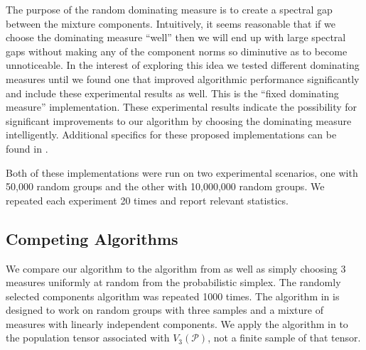 \documentclass[aos,preprint]{imsart}
\def\sP{\mathscr{P}}
\theoremstyle{plain}
\theoremstyle{defintion}
\begin{document}
	The purpose of the random dominating measure is to create a spectral gap between the mixture components. Intuitively, it seems reasonable that if we choose the dominating measure ``well'' then we will end up with large spectral gaps without making any of the component norms so diminutive as to become unnoticeable. In the interest of exploring this idea we tested different dominating measures until we found one that improved algorithmic performance significantly and include these experimental results as well. This is the ``fixed dominating measure'' implementation. These experimental results indicate the possibility for significant improvements to our algorithm by choosing the dominating measure intelligently. Additional specifics for these proposed implementations can be found in \cite{arxiv16}.

	Both of these implementations were run on two experimental scenarios, one with 50,000 random groups and the other with 10,000,000 random groups. We repeated each experiment 20 times and report relevant statistics.

\subsection{Competing Algorithms}
We compare our algorithm to the algorithm from \cite{anandkumar14} as well as simply choosing $3$ measures uniformly at random from the probabilistic simplex. The randomly selected components algorithm was repeated 1000 times. The algorithm in \cite{anandkumar14} is designed to work on random groups with three samples and a mixture of measures with linearly independent components. We apply the algorithm in \cite{anandkumar14} to the population tensor associated with $V_3\left(\sP \right)$, not a finite sample of that tensor.
\end{document}
